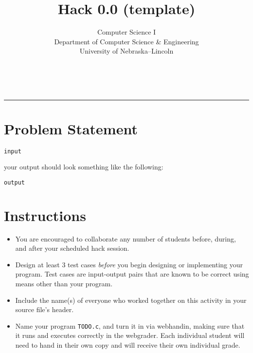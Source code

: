 \documentclass[12pt]{scrartcl}
\title{Hack 0.0 (template)}\let\Title\@title
\subtitle{Computer Science I\\
{\small
\vskip1cm
Department of Computer Science \& Engineering \\
University of Nebraska--Lincoln}
\vskip-1cm}
\date{~}
\begin{document}
\maketitle

\hrule




\section*{Problem Statement}

\texttt{input} 

your output should look something like the following:

\begin{verbatim}
output
\end{verbatim}

\section*{Instructions}

\begin{itemize}
  \item You are encouraged to collaborate any number of students 
  before, during, and after your scheduled hack session.  
  \item Design at least 3 test cases \emph{before} you begin
  designing or implementing your program.  Test cases are 
  input-output pairs that are known to be correct using means
  other than your program.
  \item Include the name(s) of everyone who worked together on
  this activity in your source file's header.
  \item Name your program \texttt{TODO.c}, and
  turn it in via webhandin, making sure that it runs and executes
  correctly in the webgrader.  Each individual student will need
  to hand in their own copy and will receive their own individual
  grade.
\end{itemize}
  
\end{document}
